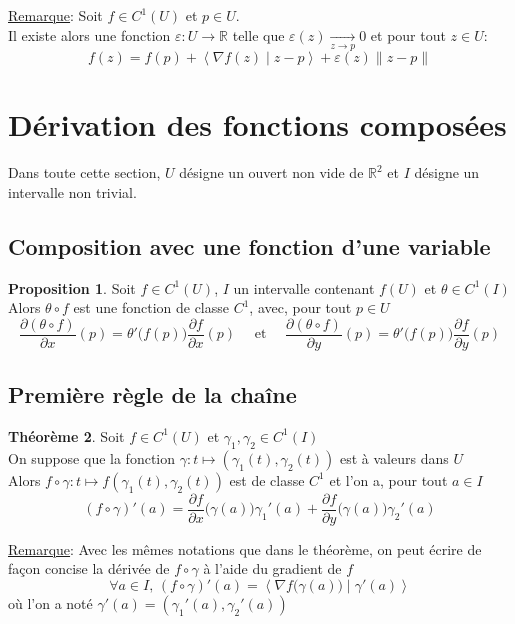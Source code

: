 \documentclass[10pt,a4paper]{article}
\theoremstyle{definition}
\newtheorem{proposition}{Proposition}[section]
\newtheorem{theorem}[proposition]{Théorème}
\begin{document}
\noindent \uline{Remarque}: Soit $f \in C^1(U)$ et $p \in U$. \\
Il existe alors une fonction $\varepsilon: U \to \mathbb{R}$ telle que $\varepsilon(z) \xrightarrow[z \to p]{} 0$ et pour tout $z \in U$:
\[ f(z) = f(p) + \left<\nabla f(z) \mid z - p\right> + \varepsilon(z) \| z - p \| \]

\section{Dérivation des fonctions composées}
Dans toute cette section, $U$ désigne un ouvert non vide de $\mathbb{R}^2$ et $I$ désigne un intervalle non trivial.
\subsection{Composition avec une fonction d'une variable}
\begin{proposition}
Soit $f \in C^1(U)$, $I$ un intervalle contenant $f(U)$ et $\theta \in C^1(I)$ \\
Alors $\theta \circ f$ est une fonction de classe $C^1$, avec, pour tout $p \in U$
\[ \frac{\partial(\theta \circ f)}{\partial x}(p) = \theta'\big(f(p)\big) \frac{\partial f}{\partial x}(p) \quad \text{ et } \quad \frac{\partial(\theta \circ f)}{\partial y}(p) = \theta'\big(f(p)\big) \frac{\partial f}{\partial y}(p) \]
\end{proposition}

\subsection{Première règle de la chaîne}
\begin{theorem}
Soit $f \in C^1(U)$ et $\gamma_1, \gamma_2 \in C^1(I)$\\
 On suppose que la fonction $\gamma: t \mapsto \left( \gamma_1(t), \gamma_2(t)\right)$ est à valeurs dans $U$ \\
Alors $f \circ \gamma: t \mapsto f\left( \gamma_1(t), \gamma_2(t)\right)$ est de classe $C^1$ et l'on a, pour tout $a \in I$
\[ (f \circ \gamma)'(a) = \frac{\partial f}{\partial x}\big(\gamma(a)\big)\gamma_1'(a) + \frac{\partial f}{\partial y}\big(\gamma(a)\big)\gamma_2'(a) \]
\end{theorem}

\noindent \uline{Remarque}: Avec les mêmes notations que dans le théorème, on peut écrire de façon concise la dérivée de $f \circ \gamma$ à l'aide du gradient de $f$
\[ \forall a \in I,\, (f \circ \gamma)'(a) = \left< \nabla f\big(\gamma(a)\big) \mid \gamma'(a) \right> \]
où l'on a noté $\gamma'(a) = \left(\gamma_1'(a), \gamma_2'(a)\right)$
\end{document}
